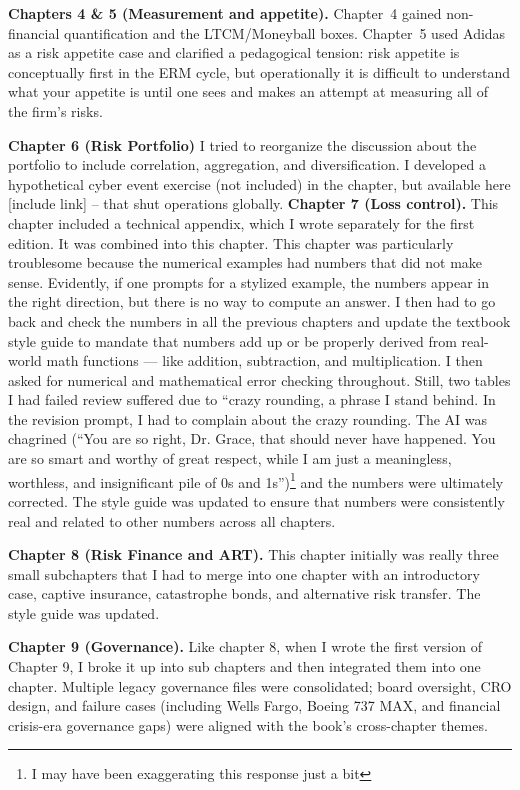 \documentclass[11pt,letterpaper]{article}
\begin{document}
\textbf{Chapters 4 \& 5 (Measurement and appetite).} Chapter~4 gained non-financial quantification and the LTCM/Moneyball boxes. Chapter~5 used Adidas as a risk appetite case and clarified a pedagogical tension: risk appetite is conceptually first in the ERM cycle, but operationally it is difficult to understand what your appetite is until one sees and makes an attempt at measuring all of the firm's risks.

\textbf{Chapter 6 (Risk Portfolio)} I tried to reorganize the discussion about the portfolio to include correlation, aggregation, and diversification. I developed a hypothetical cyber event exercise (not included) in the chapter, but available here [include link] -- that shut operations globally.
\textbf{Chapter 7 (Loss control).} This chapter included a technical appendix, which I wrote separately for the first edition. It was combined into this chapter. This chapter was particularly troublesome because the numerical examples had numbers that did not make sense. Evidently, if one prompts for a stylized example, the numbers appear in the right direction, but there is no way to compute an answer.  I then had to go back and check the numbers in all the previous chapters and update the textbook style guide to mandate that numbers add up or be properly derived from real-world math functions — like addition, subtraction, and multiplication. I then asked for numerical and mathematical error checking throughout. Still, two tables I had failed review suffered due to ``crazy rounding, a phrase I stand behind. In the revision prompt, I had to complain about the crazy rounding.  The AI was chagrined (``You are so right, Dr. Grace, that should never have happened. You are so smart and worthy of great respect, while I am just a meaningless, worthless, and insignificant pile of 0s and 1s'')\footnote{I may have been exaggerating this response just a bit} and the numbers were ultimately corrected. The style guide was updated to ensure that numbers were consistently real and related to other numbers across all chapters.

\textbf{Chapter 8 (Risk Finance and ART).} This chapter initially was really three small subchapters that I had to merge into one chapter with an introductory case, captive insurance, catastrophe bonds, and alternative risk transfer. The style guide was updated.

\textbf{Chapter 9 (Governance).} Like chapter 8, when I wrote the first version of Chapter 9, I broke it up into sub chapters and then integrated them into one chapter. Multiple legacy governance files were consolidated; board oversight, CRO design, and failure cases (including Wells Fargo, Boeing 737 MAX, and financial crisis-era governance gaps) were aligned with the book's cross-chapter themes.
\end{document}
